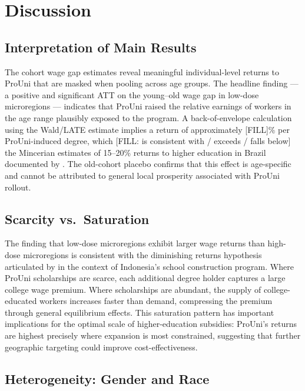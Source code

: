 \chapter{Discussion}
\label{ch:discussion}

\section{Interpretation of Main Results}
\label{sec:interpretation}

The cohort wage gap estimates reveal meaningful individual-level returns to ProUni that are masked when pooling across age groups. The headline finding --- a positive and significant ATT on the young--old wage gap in low-dose microregions --- indicates that ProUni raised the relative earnings of workers in the age range plausibly exposed to the program. A back-of-envelope calculation using the Wald/LATE estimate implies a return of approximately [FILL]\% per ProUni-induced degree, which [FILL: is consistent with / exceeds / falls below] the Mincerian estimates of 15--20\% returns to higher education in Brazil documented by . The old-cohort placebo confirms that this effect is age-specific and cannot be attributed to general local prosperity associated with ProUni rollout.

\section{Scarcity vs.\ Saturation}
\label{sec:saturation}

The finding that low-dose microregions exhibit larger wage returns than high-dose microregions is consistent with the diminishing returns hypothesis articulated by  in the context of Indonesia's school construction program. Where ProUni scholarships are scarce, each additional degree holder captures a large college wage premium. Where scholarships are abundant, the supply of college-educated workers increases faster than demand, compressing the premium through general equilibrium effects. This saturation pattern has important implications for the optimal scale of higher-education subsidies: ProUni's returns are highest precisely where expansion is most constrained, suggesting that further geographic targeting could improve cost-effectiveness.

\section{Heterogeneity: Gender and Race}
\label{sec:hetero_discussion}

